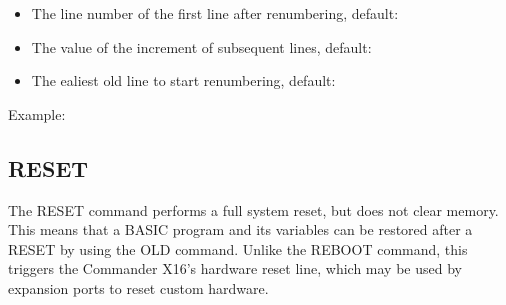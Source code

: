 \begin{itemize}

	\item The line number of the first line after renumbering, default: {}

	\item The value of the increment of subsequent lines, default: {}

	\item The ealiest old line to start renumbering, default: {}

\end{itemize}

\vspace{16pt}

Example:\\


\subsection{RESET}

The {\ttfamily RESET} command performs a full system reset, but does not clear
memory.  This means that a BASIC program and its variables can be restored
after a {\ttfamily RESET} by using the {\ttfamily OLD} command.  Unlike the
{\ttfamily REBOOT} command, this triggers the Commander X16's hardware reset
line, which may be used by expansion ports to reset custom hardware.\\

